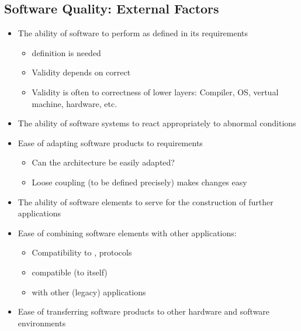 \subsection{Software Quality: External Factors}
\begin{defBox}[title=External quality facotrs\, perceived by Costomer or User]
    \begin{itemize}
        \item {} The ability of software to perform as defined in its requirements
        \begin{itemize}
            \item {} definition is needed
            \item Validity depends on correct 
            \item Validity is often  to correctness of lower layers: Compiler, OS, vertual machine, hardware, etc. 
        \end{itemize}
        \item {} The ability of software systems to react appropriately to abnormal conditions 
        \item {} Ease of adapting software products to  requirements
        \begin{itemize}
            \item {} Can the architecture be easily adapted?
            \item {} Loose coupling (to be defined precisely) makes changes easy
        \end{itemize}
        \item {} The ability of software elements to serve for the construction of further applications
        \item {} Ease of combining software elements with other applications:
        \begin{itemize}
            \item Compatibility to , protocols
            \item {} compatible (to itself)
            \item {} with other (legacy) applications
        \end{itemize}
        \item {} Ease of transferring software products to other hardware and software environments

\end{itemize}
\end{defBox}
